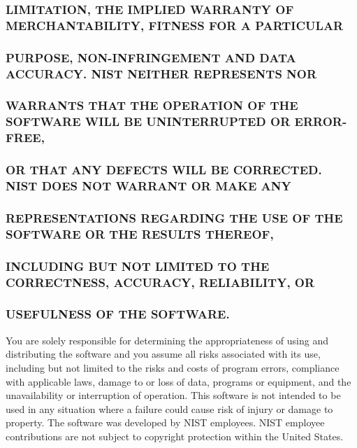 \subsubsection*{L\+I\+M\+I\+T\+A\+T\+I\+ON, T\+HE I\+M\+P\+L\+I\+ED W\+A\+R\+R\+A\+N\+TY OF M\+E\+R\+C\+H\+A\+N\+T\+A\+B\+I\+L\+I\+TY, F\+I\+T\+N\+E\+SS F\+OR A P\+A\+R\+T\+I\+C\+U\+L\+AR}

\subsubsection*{P\+U\+R\+P\+O\+SE, N\+O\+N-\/\+I\+N\+F\+R\+I\+N\+G\+E\+M\+E\+NT A\+ND D\+A\+TA A\+C\+C\+U\+R\+A\+CY. N\+I\+ST N\+E\+I\+T\+H\+ER R\+E\+P\+R\+E\+S\+E\+N\+TS N\+OR}

\subsubsection*{W\+A\+R\+R\+A\+N\+TS T\+H\+AT T\+HE O\+P\+E\+R\+A\+T\+I\+ON OF T\+HE S\+O\+F\+T\+W\+A\+RE W\+I\+LL BE U\+N\+I\+N\+T\+E\+R\+R\+U\+P\+T\+ED OR E\+R\+R\+O\+R-\/\+F\+R\+EE,}

\subsubsection*{OR T\+H\+AT A\+NY D\+E\+F\+E\+C\+TS W\+I\+LL BE C\+O\+R\+R\+E\+C\+T\+ED. N\+I\+ST D\+O\+ES N\+OT W\+A\+R\+R\+A\+NT OR M\+A\+KE A\+NY}

\subsubsection*{R\+E\+P\+R\+E\+S\+E\+N\+T\+A\+T\+I\+O\+NS R\+E\+G\+A\+R\+D\+I\+NG T\+HE U\+SE OF T\+HE S\+O\+F\+T\+W\+A\+RE OR T\+HE R\+E\+S\+U\+L\+TS T\+H\+E\+R\+E\+OF,}

\subsubsection*{I\+N\+C\+L\+U\+D\+I\+NG B\+UT N\+OT L\+I\+M\+I\+T\+ED TO T\+HE C\+O\+R\+R\+E\+C\+T\+N\+E\+SS, A\+C\+C\+U\+R\+A\+CY, R\+E\+L\+I\+A\+B\+I\+L\+I\+TY, OR}

\subsubsection*{U\+S\+E\+F\+U\+L\+N\+E\+SS OF T\+HE S\+O\+F\+T\+W\+A\+RE.}

You are solely responsible for determining the appropriateness of using and distributing the software and you assume all risks associated with its use, including but not limited to the risks and costs of program errors, compliance with applicable laws, damage to or loss of data, programs or equipment, and the unavailability or interruption of operation. This software is not intended to be used in any situation where a failure could cause risk of injury or damage to property. The software was developed by N\+I\+ST employees. N\+I\+ST employee contributions are not subject to copyright protection within the United States. 

